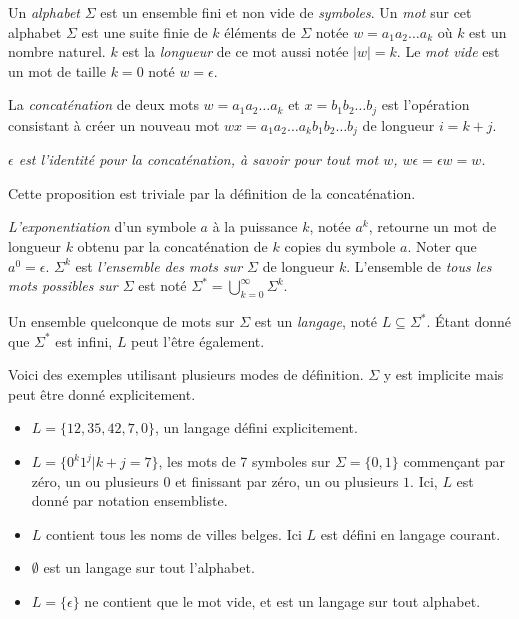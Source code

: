 Un \emph{alphabet} $\Sigma$ est un ensemble fini et non vide de \emph{symboles}. Un \emph{mot} sur cet alphabet $\Sigma$ est une suite finie de $k$ éléments de $\Sigma$ notée $ w = a_1a_2\dots a_k$ où $k$ est un nombre naturel. $k$ est la \emph{longueur} de ce mot aussi notée $|w|=k$. Le \emph{mot vide} est un mot de taille $k=0$ noté $w=\epsilon$.

La \emph{concaténation} de deux mots $w=a_1a_2\dots a_k$ et $x=b_1b_2\dots b_j$ est l'opération consistant à créer un nouveau mot $wx=a_1a_2\dots a_kb_1b_2\dots b_j$ de longueur $i=k+j$.

\begin{proposition}\emph{
$\epsilon$ est \emph{l'identité pour la concaténation}, à savoir pour tout mot $w$, $w\epsilon = \epsilon w = w$.}
\end{proposition}

Cette proposition est triviale par la définition de la concaténation.

\emph{L'exponentiation} d'un symbole $a$ à la puissance $k$, notée $a^k$, retourne un mot de longueur $k$ obtenu par la concaténation de $k$ copies du symbole $a$. Noter que $a^0=\epsilon$. $\Sigma^k$ est \emph{l'ensemble des mots sur $\Sigma$} de longueur $k$. L'ensemble de \emph{tous les mots possibles sur $\Sigma$} est noté $\Sigma^* = \bigcup_{k=0}^{\infty}\Sigma^k$.


Un ensemble quelconque de mots sur $\Sigma$ est un \emph{langage}, noté $L \subseteq \Sigma^*$. Étant donné que $\Sigma^*$ est infini, $L$ peut l'être également.

\begin{example}[Langages] Voici des exemples utilisant plusieurs modes de définition. $\Sigma$ y est implicite mais peut être donné explicitement.
	\begin{itemize}
		\item $L=\{12,35,42,7,0\}$, un langage défini explicitement.
		\item $L=\{0^k1^j|k+j=7\}$, les mots de 7 symboles sur $\Sigma=\{0,1\}$ commençant par zéro, un ou plusieurs $0$ et finissant par zéro, un ou plusieurs $1$. Ici, $L$ est donné par notation ensembliste.
		\item $L$ contient tous les noms de villes belges. Ici $L$ est défini en langage courant.
		\item $\emptyset$ est un langage sur tout l'alphabet.
		\item $L=\{\epsilon\}$ ne contient que le mot vide, et est un langage sur tout alphabet.
	\end{itemize}
\end{example}

